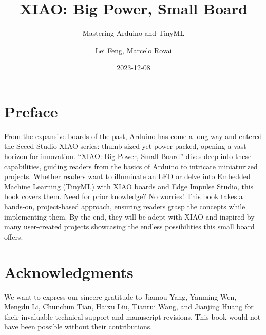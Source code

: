 \documentclass[
  letterpaper,
  DIV=11,
  numbers=noendperiod]{scrreprt}
\title{XIAO: Big Power, Small Board}
\subtitle{Mastering Arduino and TinyML}
\author{Lei Feng, Marcelo Rovai}
\date{2023-12-08}
\renewcommand*\contentsname{Table of contents}
\newcommand\contentsname{Table of contents}
\begin{document}
\maketitle
\ifdefined\Shaded\renewenvironment{Shaded}{\begin{tcolorbox}[sharp corners, interior hidden, borderline west={3pt}{0pt}{shadecolor}, frame hidden, enhanced, breakable, boxrule=0pt]}{\end{tcolorbox}}\fi

\renewcommand*\contentsname{Table of contents}
{
\hypersetup{linkcolor=}
\setcounter{tocdepth}{2}
\tableofcontents
}

\hypertarget{preface}{%
\chapter*{Preface}\label{preface}}


From the expansive boards of the past, Arduino has come a long way and
entered the Seeed Studio XIAO series: thumb-sized yet power-packed,
opening a vast horizon for innovation. ``XIAO: Big Power, Small Board''
dives deep into these capabilities, guiding readers from the basics of
Arduino to intricate miniaturized projects. Whether readers want to
illuminate an LED or delve into Embedded Machine Learning (TinyML) with
XIAO boards and Edge Impulse Studio, this book covers them. Need for
prior knowledge? No worries! This book takes a hands-on, project-based
approach, ensuring readers grasp the concepts while implementing them.
By the end, they will be adept with XIAO and inspired by many
user-created projects showcasing the endless possibilities this small
board offers.


\hypertarget{acknowledgments}{%
\chapter*{Acknowledgments}\label{acknowledgments}}


We want to express our sincere gratitude to Jiamou Yang, Yanming Wen,
Mengdu Li, Chunchun Tian, Haixu Liu, Tianrui Wang, and Jianjing Huang
for their invaluable technical support and manuscript revisions. This
book would not have been possible without their contributions.
\end{document}
